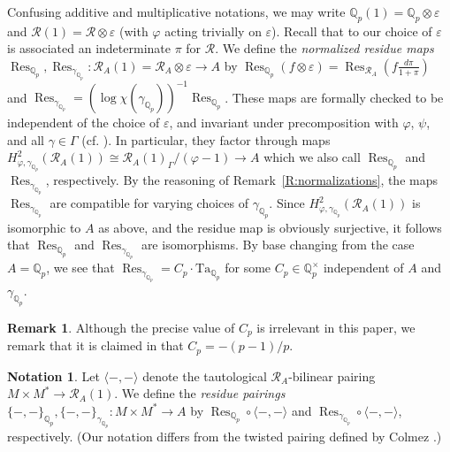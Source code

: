 \documentclass[12pt]{article}
\theoremstyle{definition}
\newtheorem{remark}[theorem]{Remark}
\newtheorem{notation}[theorem]{Notation}
\numberwithin{equation}{theorem}
\newcommand{\calR}{\mathcal{R}}
\newcommand{\QQ}{\mathbb{Q}}
\def\Qp{\QQ_p}
\newcommand{\Ta}{\mathrm{Ta}}
\DeclareMathOperator{\Res}{Res}
\begin{document}
Confusing additive and multiplicative notations, we may write
$\QQ_p(1) = \QQ_p \otimes \varepsilon$ and $\calR(1) = \calR \otimes
\varepsilon$ (with $\varphi$ acting trivially on $\varepsilon$).
Recall that to our choice of $\varepsilon$ is associated an
indeterminate $\pi$ for $\calR$.  We define the \emph{normalized
  residue maps} $\Res_{\Qp}, \Res_{\gamma_{\Qp}}: \calR_A(1) = \calR_A
\otimes \varepsilon \to A$ by $\Res_{\Qp}(f \otimes \varepsilon) =
\Res_{\calR_A}(f\frac{d\pi}{1+\pi})$ and $\Res_{\gamma_{\Qp}} =
(\log\chi(\gamma_{\Qp}))^{-1} \Res_{\Qp}$.  These maps are formally
checked to be independent of the choice of $\varepsilon$, and
invariant under precomposition with $\varphi$, $\psi$, and all $\gamma
\in \Gamma$ (cf. \cite[\S I.2]{colmez-mirabolique}).  In particular,
they factor through maps $H^2_{\varphi,\gamma_{\Qp}}(\calR_A(1)) \cong
\calR_A(1)_\Gamma/(\varphi-1) \to A$ which we also call $\Res_{\Qp}$
and $\Res_{\gamma_{\Qp}}$, respectively.  By the reasoning of
Remark~\ref{R:normalizations}, the maps $\Res_{\gamma_{\Qp}}$ are
compatible for varying choices of $\gamma_{\Qp}$.  Since
$H^2_{\varphi,\gamma_{\Qp}}(\calR_A(1))$ is isomorphic to $A$ as
above, and the residue map is obviously surjective, it follows that
$\Res_{\Qp}$ and $\Res_{\gamma_{\Qp}}$ are isomorphisms.  By base
changing from the case $A=\Qp$, we see that $\Res_{\gamma_{\Qp}} = C_p
\cdot \Ta_{\Qp}$ for some $C_p \in \QQ_p^\times$ independent of $A$
and $\gamma_{\Qp}$.

\begin{remark}
Although the precise value of $C_p$ is irrelevant in this paper, we
remark that it is claimed in \cite[Theorem~2.2.6]{benois} that $C_p =
-(p-1)/p$.
\end{remark}

\begin{notation}
\label{N:residue pairing}
Let $\langle -, -\rangle$ denote the tautological $\calR_A$-bilinear
pairing $M \times M^* \to \calR_A(1)$.  We define the \emph{residue
  pairings} $\{-,-\}_{\Qp},\{-,-\}_{\gamma_{\Qp}}: M \times M^* \to A$
by $\Res_{\Qp} \circ \langle-,-\rangle$ and $\Res_{\gamma_{\Qp}} \circ
\langle -, -\rangle$, respectively.  (Our notation differs from the
twisted pairing defined by Colmez \cite{colmez-kirillov}.)
\end{notation}
\end{document}

